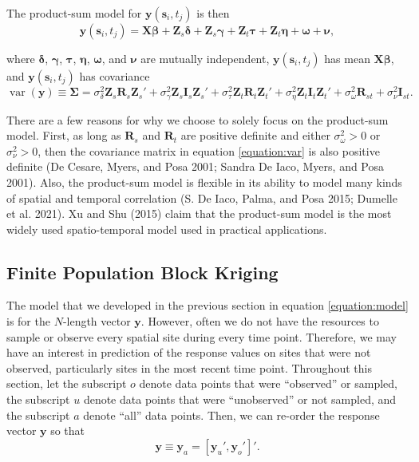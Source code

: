 \documentclass[]{article}    %
\begin{document}
The product-sum model for \(\mathbf{y}(\mathbf{s}_{i}, t_j)\) is then
\mbox{} \begin{equation} \label{equation:model}
\mathbf{y}(\mathbf{s}_{i}, t_j) = \mathbf{X} \bm{\beta} + \mathbf{Z}_{s} \bm{\delta} + \mathbf{Z}_{s} \bm{\gamma} + \mathbf{Z}_t \bm{\tau} + \mathbf{Z}_t \bm{\eta} + \bm{\omega} + \bm{\nu},
\end{equation}

\noindent where \(\bm{\delta}\), \(\bm{\gamma}\), \(\bm{\tau}\),
\(\bm{\eta}\), \(\bm{\omega}\), and \(\bm{\nu}\) are mutually
independent, \(\mathbf{y}(\mathbf{s}_{i}, t_j)\) has mean
\(\mathbf{X} \bm{\beta}\), and \(\mathbf{y}(\mathbf{s}_{i}, t_j)\) has
covariance \mbox{} \begin{equation}
\label{equation:var}
\mathop{\mathrm{{var}}}(\mathbf{y}) \equiv \bm{\Sigma} = \sigma^2_{\delta} \mathbf{Z}_{s} \mathbf{R}_{s} \mathbf{Z}_{s}' + \sigma^2_{\gamma} \mathbf{Z}_{s} \mathbf{I}_{s} \mathbf{Z}_{s}' + \sigma^2_{\tau} \mathbf{Z}_t \mathbf{R}_t \mathbf{Z}_t'+ \sigma^2_{\eta} \mathbf{Z}_t \mathbf{I}_t \mathbf{Z}_t' + \sigma^2_{\omega} \mathbf{R}_{st} + \sigma^2_{\nu} \mathbf{I}_{st}.
\end{equation}

\noindent There are a few reasons for why we choose to solely focus on
the product-sum model. First, as long as \(\mathbf{R}_s\) and
\(\mathbf{R}_t\) are positive definite and either
\(\sigma^2_{\omega} > 0\) or \(\sigma^2_{\nu} > 0\), then the covariance
matrix in equation \ref{equation:var} is also positive definite (De
Cesare, Myers, and Posa 2001; Sandra De Iaco, Myers, and Posa 2001).
Also, the product-sum model is flexible in its ability to model many
kinds of spatial and temporal correlation (S. De Iaco, Palma, and Posa
2015; Dumelle et al. 2021). Xu and Shu (2015) claim that the product-sum
model is the most widely used spatio-temporal model used in practical
applications.

\hypertarget{subsection:fpbk}{%
\subsection{Finite Population Block Kriging}\label{subsection:fpbk}}

The model that we developed in the previous section in equation
\ref{equation:model} is for the \(N\)-length vector \(\mathbf{y}\).
However, often we do not have the resources to sample or observe every
spatial site during every time point. Therefore, we may have an interest
in prediction of the response values on sites that were not observed,
particularly sites in the most recent time point. Throughout this
section, let the subscript \(o\) denote data points that were
``observed'' or sampled, the subscript \(u\) denote data points that
were ``unobserved'' or not sampled, and the subscript \(a\) denote
``all'' data points. Then, we can re-order the response vector
\(\mathbf{y}\) so that \mbox{} \begin{equation} \label{equation:ordered}
\mathbf{y} \equiv \mathbf{y}_a = [\mathbf{y}_u', \mathbf{y}_o']'.
\end{equation}
\end{document}

